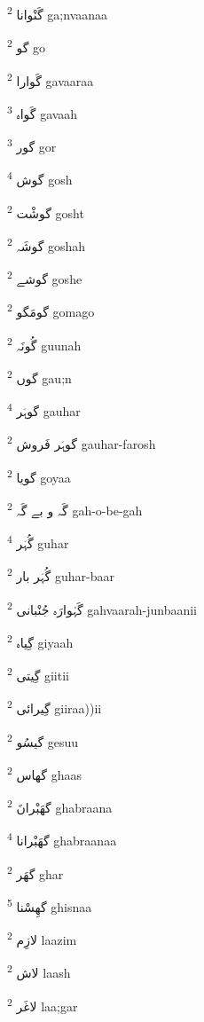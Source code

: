 \documentclass[12pt]{article}
\begin{document}
\begin{multicols}{5}
{\ur گَنْوانا}   \textsuperscript{2} ga;nvaanaa

{\ur گو}   \textsuperscript{2} go

{\ur گَوارا}   \textsuperscript{2} gavaaraa

{\ur گَواہ}   \textsuperscript{3} gavaah

{\ur گور}   \textsuperscript{3} gor

{\ur گوش}   \textsuperscript{4} gosh

{\ur گوشْت}   \textsuperscript{2} gosht

{\ur گوشَہ}   \textsuperscript{2} goshah

{\ur گوشے}   \textsuperscript{2} goshe

{\ur گومَگو}   \textsuperscript{2} gomago

{\ur گُونَہ}   \textsuperscript{2} guunah

{\ur گوں}   \textsuperscript{2} gau;n

{\ur گوہَر}   \textsuperscript{4} gauhar

{\ur گوہَر فَروش}   \textsuperscript{2} gauhar-farosh

{\ur گویا}   \textsuperscript{2} goyaa

{\ur گَہ و بے گَہ}   \textsuperscript{2} gah-o-be-gah

{\ur گُہَر}   \textsuperscript{4} guhar

{\ur گُہَر بار}   \textsuperscript{2} guhar-baar

{\ur گَہْوارَہ جُنْبانی}   \textsuperscript{2} gahvaarah-junbaanii

{\ur گِیاہ}   \textsuperscript{2} giyaah

{\ur گِیتی}   \textsuperscript{2} giitii

{\ur گِیرائی}   \textsuperscript{2} giiraa))ii

{\ur گیسُو}   \textsuperscript{2} gesuu

{\ur گھاس}   \textsuperscript{2} ghaas

{\ur گھَبْرانَ}   \textsuperscript{2} ghabraana

{\ur گھَبْرانا}   \textsuperscript{4} ghabraanaa

{\ur گھَر}   \textsuperscript{2} ghar

{\ur گھِسْنا}   \textsuperscript{5} ghisnaa

{\ur لازِم}   \textsuperscript{2} laazim

{\ur لاش}   \textsuperscript{2} laash

{\ur لاغَر}   \textsuperscript{2} laa;gar


\end{multicols}
\end{document}
